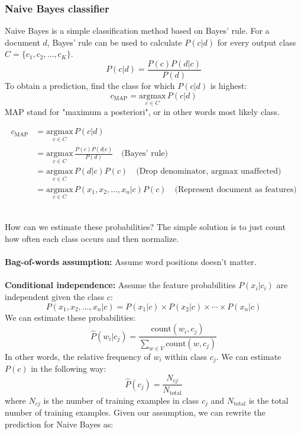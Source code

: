 \documentclass[11pt]{article}
\begin{document}
\subsubsection{Naive Bayes classifier}
Naive Bayes is a simple classification method based on Bayes' rule. For a document $d$, Bayes' rule can be used to calculate $P(c|d)$ for every output class $C=\{c_1,c_2,\dots,c_K\}$.
$$
P(c|d)=\frac{P(c)P(d|c)}{P(d)}
$$
To obtain a prediction, find the class for which $P(c|d)$ is highest:
$$
c_{\text{MAP}}=\underset{c\in C}{\text{argmax}}\hspace{2pt}P(c|d)
$$
MAP stand for "maximum a posteriori", or in other words most likely class.
\begin{note_special}[Derivation]
\begin{align*}
    c_{\text{MAP}}&=\underset{c\in C}{\text{argmax}}\hspace{2pt}P(c|d) \\
    &= \underset{c\in C}{\text{argmax}}\hspace{2pt}\frac{P(c)P(d|c)}{P(d)}\quad\text{(Bayes' rule)} \\
    &=\underset{c\in C}{\text{argmax}}\hspace{2pt}P(d|c)P(c)\quad\text{(Drop denominator, argmax unaffected)} \\
    &=\underset{c\in C}{\text{argmax}}\hspace{2pt}P(x_1,x_2,\dots,x_n|c)P(c)\quad\text{(Represent document as features)}
\end{align*}
\end{note_special}
$\quad$\\[-1em]
How can we estimate these probabilities? The simple solution is to just count how often each class occurs and then normalize. 
\\\\
\textbf{Bag-of-words assumption:} Assume word positions doesn't matter. \\\\
\textbf{Conditional independence:} Assume the feature probabilities $P(x_i|c_i)$ are independent given the class $c$:
$$
P(x_1,x_2,\dots,x_n|c)=P(x_1|c)\times P(x_2|c)\times\cdots\times P(x_n|c)
$$
We can estimate these probabilities:
$$
\hat{P}(w_i|c_j)=\frac{\text{count}(w_i,c_j)}{\sum_{w\in V}\text{count}(w,c_j)}
$$
In other words, the relative frequency of $w_i$ within class $c_j$. We can estimate $P(c)$ in the following way:
$$
\hat{P}(c_j)=\frac{N_{cj}}{N_\text{total}}
$$
where $N_{cj}$ is the number of training examples in class $c_j$ and $N_{\text{total}}$ is the total number of training examples. Given our assumption, we can rewrite the prediction for Naive Bayes as:
\end{document}
